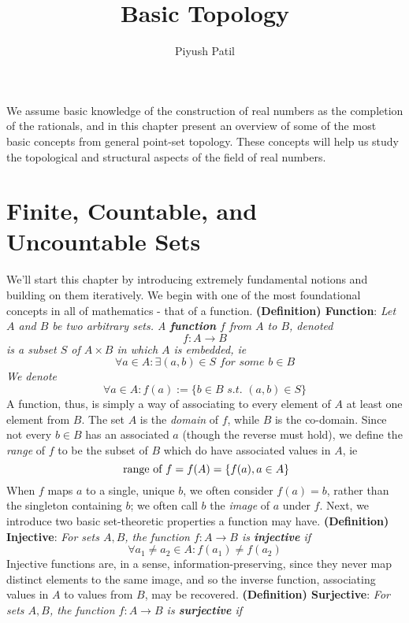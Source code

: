 \documentclass{article}
\newcommand*{\tb}{\textbf}
\newcommand*{\ti}{\textit}
\newcommand*{\nn}{\newline \newline}
\newcommand*{\sti}{\textit{ s.t. }}
\begin{document}
\title{Basic Topology}
\author{Piyush Patil}
\maketitle

We assume basic knowledge of the construction of real numbers as the completion of the rationals, and in this chapter present an overview of some of the most basic concepts from general point-set topology. These concepts will help us study the topological and structural aspects of the field of real numbers.

\section{Finite, Countable, and Uncountable Sets}
We'll start this chapter by introducing extremely fundamental notions and building on them iteratively. We begin with one of the most foundational concepts in all of mathematics - that of a function.
\nn
\tb{(Definition) Function}: \ti{Let $ A $ and $ B $ be two arbitrary sets. A \tb{function} $ f $ from $ A $ to $ B $, denoted}
    $$ f: A \rightarrow B $$
\indent \ti{is a subset $ S $ of $ A \times B $ in which $ A $ is embedded, ie}
    $$ \forall a \in A: \exists (a, b) \in S \ti{ for some } b \in B $$
\indent \ti{We denote}
    $$ \forall a \in A: f(a) := \{ b \in B \sti (a, b) \in S \} $$
A function, thus, is simply a way of associating to every element of $ A $ at least one element from $ B $. The set $ A $ is the \ti{domain} of $ f $, while $ B $ is the co-domain. Since not every $ b \in B $ has an associated $ a $ (though the reverse must hold), we define the \ti{range} of $ f $ to be the subset of $ B $ which do have associated values in $ A $, ie
    $$ \text{ range of $ f $} = f(A) = \{ f(a), a \in A \} $$
When $ f $ maps $ a $ to a single, unique $ b $, we often consider $ f(a) = b $, rather than the singleton containing $ b $; we often call $ b $ the \ti{image} of $ a $ under $ f $. Next, we introduce two basic set-theoretic properties a function may have.
\nn
\tb{(Definition) Injective}: \ti{For sets $ A, B $, the function $ f: A \rightarrow B $ is \tb{injective} if}
    $$ \forall a_1 \neq a_2 \in A: f(a_1) \neq f(a_2) $$
Injective functions are, in a sense, information-preserving, since they never map distinct elements to the same image, and so the inverse function, associating values in $ A $ to values from $ B $, may be recovered.
\nn
\tb{(Definition) Surjective}: \ti{For sets $ A, B $, the function $ f: A \rightarrow B $ is \tb{surjective} if}
\end{document}
